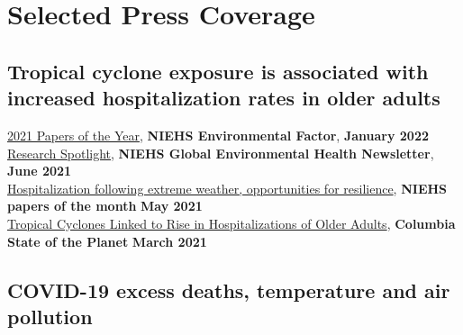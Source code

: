 \section*{Selected Press Coverage}

\subsection*{Tropical cyclone exposure is associated with increased hospitalization rates in older adults}

\href{https://factor.niehs.nih.gov/2022/1/papers/papers-of-the-year/index.htm}{2021 Papers of the Year}, \textbf{NIEHS Environmental Factor}, \hfill \textbf{January 2022}\\
\href{https://www.niehs.nih.gov/research/programs/geh/geh_newsletter/2021/6/spotlight/hurricanes_and_tropical_cyclones_associated_with_increased_hospitalization_rates_in_older_adults.cfm}{Research Spotlight}, \textbf{NIEHS Global Environmental Health Newsletter}, \hfill \textbf{June 2021}\\
\href{https://factor.niehs.nih.gov/2021/5/papers/dert/index.htm?utm_source=efactor-newsletter&utm_medium=email&utm_campaign=efactor-newsletter-2021-May#a3}{Hospitalization following extreme weather, opportunities for resilience}, \textbf{NIEHS papers of the month} \hfill \textbf{May 2021}\\
\href{https://news.climate.columbia.edu/2021/03/09/tropical-cyclones-linked-rise-hospitalizations-older-adults/}{Tropical Cyclones Linked to Rise in Hospitalizations of Older Adults}, \textbf{Columbia State of the Planet} \hfill \textbf{March 2021}

\subsection*{COVID-19 excess deaths, temperature and air pollution}


